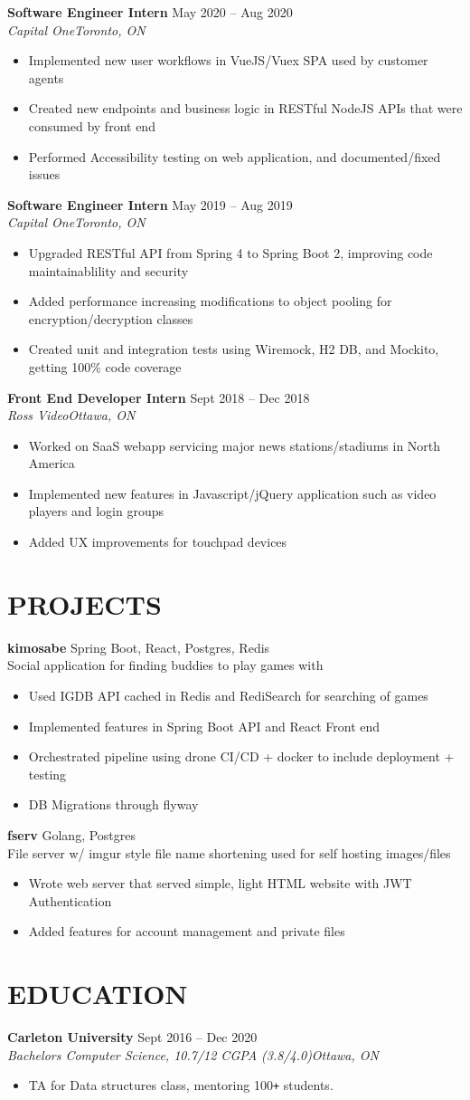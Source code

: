 \documentclass[letterpaper]{article}
\newcommand{\NewPart}[1]{\section*{\large\uppercase{\textbf{#1}}}}
\newcommand{\DatedEntry}[5]{\small\textbf{#1}
	\hfill \small{#2}\\
	\textit{#3}\hfill\textit{#4}\\\vspace{0.1cm}
	#5\vspace{0.1cm}
}
\newcommand{\ProjectEntry}[4]{\textbf{#1}
	\hfill \small{#2}\\
	#3\\\vspace{0.1cm}
	#4\vspace{0.1cm}
}
\begin{document}
\DatedEntry{Software Engineer Intern}
{May 2020 -- Aug 2020}
{Capital One}
{Toronto, ON}
{\begin{itemize}[nolistsep]
	\item Implemented new user workflows in VueJS/Vuex SPA used by customer agents
	\item Created new endpoints and business logic in RESTful NodeJS APIs that were consumed by front end
	\item Performed Accessibility testing on web application, and documented/fixed issues
\end{itemize}}
\DatedEntry{Software Engineer Intern}
{May 2019 -- Aug 2019}
{Capital One}
{Toronto, ON}
{\begin{itemize}[nolistsep]
	\item Upgraded RESTful API from Spring 4 to Spring Boot 2, improving code maintainablility and security
	\item Added performance increasing modifications to object pooling for encryption/decryption classes
	\item Created unit and integration tests using Wiremock, H2 DB, and Mockito, getting 100\% code coverage
\end{itemize}}
\DatedEntry{Front End Developer Intern}
{Sept 2018 -- Dec 2018}
{Ross Video}
{Ottawa, ON}
{\begin{itemize}[nolistsep]
	\item Worked on SaaS webapp servicing major news stations/stadiums in North America
	\item Implemented new features in Javascript/jQuery application such as video players and login groups
	\item Added UX improvements for touchpad devices
\end{itemize}}
\vspace{-0.3cm}

\NewPart{Projects}
\ProjectEntry{kimosabe}
{Spring Boot, React, Postgres, Redis}
{Social application for finding buddies to play games with}
{\begin{itemize}
	\item Used IGDB API cached in Redis and RediSearch for searching of games
	\item Implemented features in Spring Boot API and React Front end
	\item Orchestrated pipeline using drone CI/CD + docker to include deployment + testing
	\item DB Migrations through flyway
\end{itemize}}
\ProjectEntry{fserv}
{Golang, Postgres}
{File server w/ imgur style file name shortening used for self hosting images/files}
{\begin{itemize}
	\item Wrote web server that served simple, light HTML website with JWT Authentication
	\item Added features for account management and private files
\end{itemize}}\vspace{-0.3cm}

\NewPart{Education}
\DatedEntry{Carleton University}
{Sept 2016 -- Dec 2020}
{Bachelors Computer Science, 10.7/12 CGPA (3.8/4.0)}
{Ottawa, ON}
{\begin{itemize}
	\item TA for Data structures class, mentoring 100\texttt{+} students.
\end{itemize}}
\end{document}
